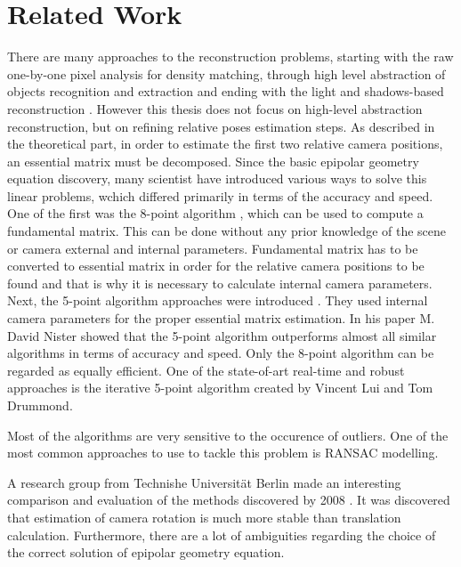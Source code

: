 
\chapter{Related Work} %
There are many approaches to the reconstruction problems, starting with the raw one-by-one pixel analysis for density matching, through high level abstraction of objects recognition and extraction and ending with the light and shadows-based reconstruction \cite{objectRecAndLoc}\cite{combinedMonoSlam}.
However this thesis does not focus on high-level abstraction reconstruction, but on refining relative poses estimation steps. As described in the theoretical part, in order to estimate the first two relative camera positions, an essential matrix must be decomposed. 
Since the basic epipolar geometry equation discovery, many scientist have introduced various ways to solve this linear problems, wchich differed primarily in terms of the accuracy and speed. One of the first was the 8-point algorithm \cite{8Point}, which can be used to compute a fundamental matrix. This can be done without any prior knowledge of the scene or camera external and internal parameters. Fundamental matrix has to be converted to essential matrix in order for the relative camera positions to be found and that is why it is necessary to calculate internal camera parameters. Next, the 5-point algorithm approaches were introduced \cite{Batra5point} \cite{Nister5point}. They used internal camera parameters for the proper essential matrix estimation. In his paper M. David Nister showed that the 5-point algorithm outperforms almost all similar algorithms in terms of accuracy and speed. Only the 8-point algorithm can be regarded as equally efficient. One of the state-of-art real-time and robust approaches is the iterative 5-point algorithm created by Vincent Lui and Tom Drummond\cite{iterative5point}.

Most of the algorithms are very sensitive to the occurence of outliers. One of the most common approaches to use to tackle this problem is RANSAC modelling\cite{RansacRefine}.

A research group from Technishe Universität Berlin made an interesting comparison and evaluation of the methods discovered by 2008 \cite{HellwichEvaluation}. It was discovered that estimation of camera rotation is much more stable than translation calculation. Furthermore, there are a lot of ambiguities regarding the choice of the correct solution of epipolar geometry equation. 

